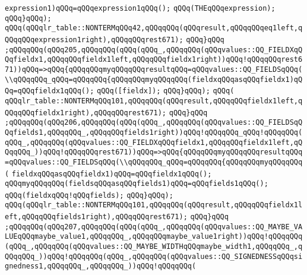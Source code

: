 \verb|expression1)qQQq=qQQqexpression1qQQq();|\newline
\verb|qQQq(THEqQQqexpression);|\newline
\verb|qQQq}qQQq);|\newline
\verb|qQQq(qQQqlr_table::NONTERMqQQq42,qQQqqQQq(qQQqresult,qQQqqQQqeq1left,qQQqqQQqexpression1right),qQQqqQQqrest671);|\newline
\verb|qQQq}qQQq|\newline
\verb|;qQQqqQQq(qQQq205,qQQqqQQq(qQQq(qQQq_,qQQqqQQq(qQQqvalues::QQ_FIELDXqQQqfieldx1,qQQqqQQqfieldx1left,qQQqqQQqfieldx1right))qQQq!qQQqqQQqrest671))qQQq=>qQQq{qQQqqQQqmyqQQqqQQqresultqQQq=qQQqvalues::QQ_FIELDSqQQq(\\qQQqqQQq_qQQq=qQQqqQQq{qQQqqQQqmyqQQqqQQq(fieldxqQQqasqQQqfieldx1)qQQq=qQQqfieldx1qQQq();|\newline
\verb|qQQq([fieldx]);|\newline
\verb|qQQq}qQQq);|\newline
\verb|qQQq(|\newline
\verb|qQQqlr_table::NONTERMqQQq101,qQQqqQQq(qQQqresult,qQQqqQQqfieldx1left,qQQqqQQqfieldx1right),qQQqqQQqrest671);|\newline
\verb|qQQq}qQQq|\newline
\verb|;qQQqqQQq(qQQq206,qQQqqQQq(qQQq(qQQq_,qQQqqQQq(qQQqvalues::QQ_FIELDSqQQqfields1,qQQqqQQq_,qQQqqQQqfields1right))qQQq!qQQqqQQq_qQQq!qQQqqQQq(qQQq_,qQQqqQQq(qQQqvalues::QQ_FIELDXqQQqfieldx1,qQQqqQQqfieldx1left,qQQqqQQq_))qQQq!qQQqqQQqrest671))qQQq=>qQQq{qQQqqQQqmyqQQqqQQqresultqQQq=qQQqvalues::QQ_FIELDSqQQq(\\qQQqqQQq_qQQq=qQQqqQQq{qQQqqQQqmyqQQqqQQq(|\newline
\verb|fieldxqQQqasqQQqfieldx1)qQQq=qQQqfieldx1qQQq();|\newline
\verb|qQQqmyqQQqqQQq(fieldsqQQqasqQQqfields1)qQQq=qQQqfields1qQQq();|\newline
\verb|qQQq(fieldxqQQq!qQQqfields);|\newline
\verb|qQQq}qQQq);|\newline
\verb|qQQq(qQQqlr_table::NONTERMqQQq101,qQQqqQQq(qQQqresult,qQQqqQQqfieldx1left,qQQqqQQqfields1right),qQQqqQQqrest671);|\newline
\verb|qQQq}qQQq|\newline
\verb|;qQQqqQQq(qQQq207,qQQqqQQq(qQQq(qQQq_,qQQqqQQq(qQQqvalues::QQ_MAYBE_VALUEqQQqmaybe_value1,qQQqqQQq_,qQQqqQQqmaybe_value1right))qQQq!qQQqqQQq(qQQq_,qQQqqQQq(qQQqvalues::QQ_MAYBE_WIDTHqQQqmaybe_width1,qQQqqQQq_,qQQqqQQq_))qQQq!qQQqqQQq(qQQq_,qQQqqQQq(qQQqvalues::QQ_SIGNEDNESSqQQqsignedness1,qQQqqQQq_,qQQqqQQq_))qQQq!qQQqqQQq(|\newline
